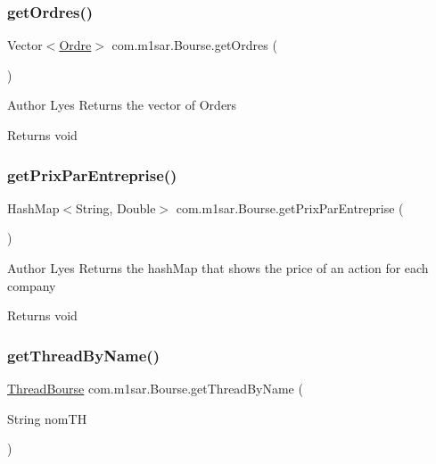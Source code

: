 \subsubsection{\texorpdfstring{get\+Ordres()}{getOrdres()}}
{\footnotesize\ttfamily Vector$<$\hyperlink{classcom_1_1m1sar_1_1_ordre}{Ordre}$>$ com.\+m1sar.\+Bourse.\+get\+Ordres (\begin{DoxyParamCaption}{ }\end{DoxyParamCaption})}

\begin{DoxyAuthor}{Author}
Lyes Returns the vector of Orders 
\end{DoxyAuthor}
\begin{DoxyReturn}{Returns}
{\ttfamily void} 
\end{DoxyReturn}
\mbox{\label{classcom_1_1m1sar_1_1_bourse_ae68d9ea867f6e9043afe0b5868dda5fe}} 
\subsubsection{\texorpdfstring{get\+Prix\+Par\+Entreprise()}{getPrixParEntreprise()}}
{\footnotesize\ttfamily Hash\+Map$<$String, Double$>$ com.\+m1sar.\+Bourse.\+get\+Prix\+Par\+Entreprise (\begin{DoxyParamCaption}{ }\end{DoxyParamCaption})}

\begin{DoxyAuthor}{Author}
Lyes Returns the hash\+Map that shows the price of an action for each company 
\end{DoxyAuthor}
\begin{DoxyReturn}{Returns}
{\ttfamily void} 
\end{DoxyReturn}
\mbox{\label{classcom_1_1m1sar_1_1_bourse_a2c4daf19799b68d297a686df4aebb0c4}} 
\subsubsection{\texorpdfstring{get\+Thread\+By\+Name()}{getThreadByName()}}
{\footnotesize\ttfamily \hyperlink{classcom_1_1m1sar_1_1_thread_bourse}{Thread\+Bourse} com.\+m1sar.\+Bourse.\+get\+Thread\+By\+Name (\begin{DoxyParamCaption}\item[{String}]{nom\+TH }\end{DoxyParamCaption})}

